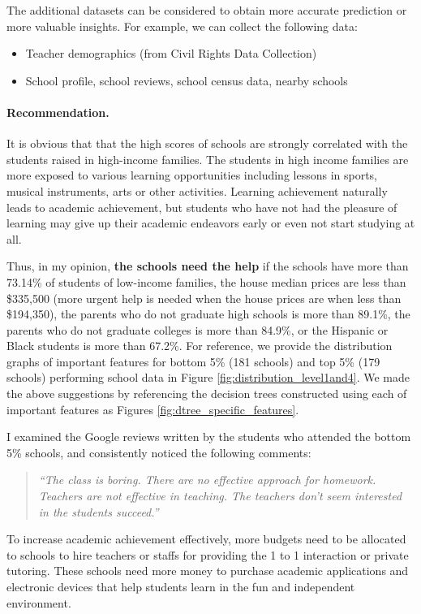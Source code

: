 \documentclass[11pt]{article}
\begin{document}
%
The additional datasets can be considered to obtain more accurate prediction or more valuable insights. For example, we can collect the following data:
\begin{itemize}
\item Teacher demographics (from Civil Rights Data Collection)
\item School profile, school reviews, school census data, nearby schools
\end{itemize}

\paragraph*{Recommendation.}

It is obvious that that the high scores of schools are strongly correlated with the students raised in high-income families.
The students in high income families are more exposed to various learning opportunities including lessons in sports, musical instruments, arts or other activities. 
%
Learning achievement naturally leads to academic achievement, but
students who have not had the pleasure of learning may give up their academic endeavors early or even not start studying at all.

Thus, in my opinion, 
\textbf{the schools need the help}
if 
the schools have more than 73.14\% of students of low-income families, 
the house median prices are less than \$335,500 (more urgent help is needed when the house prices are when less than \$194,350), 
%
the parents who do not graduate high schools is more than 89.1\%,
%
the parents who do not graduate colleges is more than 84.9\%, or
%
the Hispanic or Black students is more than 67.2\%.
%
%
For reference, we provide the distribution graphs of important features for bottom 5\% (181 schools) and top 5\% (179 schools) performing school data in Figure \ref{fig:distribution_level1and4}. We made the above suggestions by referencing the decision trees constructed using each of important features as Figures \ref{fig:dtree_specific_features}.

I examined the Google reviews written by the students who attended the bottom 5\% schools, and consistently noticed the following  comments:
\begin{quote}
\textit{``The class is boring. There are no effective approach for homework. Teachers are not effective in teaching. The teachers don't seem interested in the students succeed.''}
\end{quote}
%
To increase academic achievement effectively, 
more budgets need to be allocated to schools to hire
teachers or staffs for providing the 1 to 1 interaction or private tutoring. 
These schools need more money to purchase academic applications and electronic devices that help students learn in the fun and independent environment.
\end{document}
